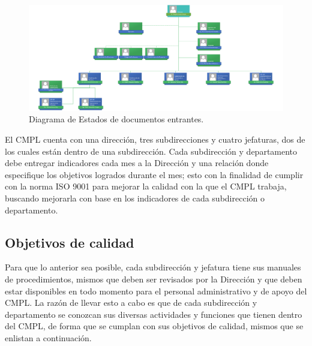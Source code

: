 	\begin{figure}[htbp!]
		\centering
			\includegraphics[width=1\textwidth]{images/Organigrama.png}
		\caption{Diagrama de Estados de documentos entrantes. \cite{Organigrama}}
		\label{fig:organigrama}
	\end{figure}
	
	El CMPL cuenta con una dirección, tres subdirecciones y cuatro jefaturas, dos de los cuales están dentro de una subdirección. Cada subdirección y departamento debe entregar indicadores cada mes a la Dirección y una relación donde especifique los objetivos logrados durante el mes; esto con la finalidad de cumplir con la norma ISO 9001 para mejorar la calidad con la que el CMPL trabaja, buscando mejorarla con base en los indicadores de cada subdirección o departamento.\\
	
	\subsection{Objetivos de calidad}
	Para que lo anterior sea posible, cada subdirección y jefatura tiene sus manuales de procedimientos, mismos que deben ser revisados por la Dirección y que deben estar disponibles en todo momento para el personal administrativo y de apoyo del CMPL. La razón de llevar esto a cabo es que de cada subdirección y departamento se conozcan sus diversas actividades y funciones que tienen dentro del CMPL, de forma que se cumplan con sus objetivos de calidad, mismos que se enlistan a continuación.\\
	
